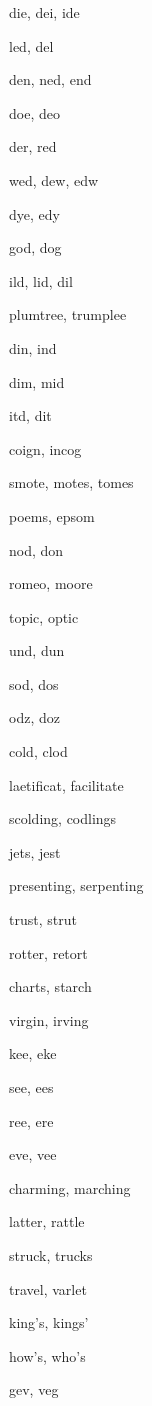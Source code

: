     \item die, dei, ide
    \item led, del
    \item den, ned, end
    \item doe, deo
    \item der, red
    \item wed, dew, edw
    \item dye, edy
    \item god, dog
    \item ild, lid, dil
    \item plumtree, trumplee
    \item din, ind
    \item dim, mid
    \item itd, dit
    \item coign, incog
    \item smote, motes, tomes
    \item poems, epsom
    \item nod, don
    \item romeo, moore
    \item topic, optic
    \item und, dun
    \item sod, dos
    \item odz, doz
    \item cold, clod
    \item laetificat, facilitate
    \item scolding, codlings
    \item jets, jest
    \item presenting, serpenting
    \item trust, strut
    \item rotter, retort
    \item charts, starch
    \item virgin, irving
    \item kee, eke
    \item see, ees
    \item ree, ere
    \item eve, vee
    \item charming, marching
    \item latter, rattle
    \item struck, trucks
    \item travel, varlet
    \item king's, kings'
    \item how's, who's
    \item gev, veg
